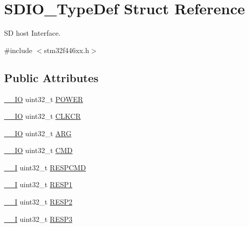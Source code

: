 \hypertarget{struct_s_d_i_o___type_def}{}\section{S\+D\+I\+O\+\_\+\+Type\+Def Struct Reference}
\label{struct_s_d_i_o___type_def}


SD host Interface.  




{\ttfamily \#include $<$stm32f446xx.\+h$>$}

\subsection*{Public Attributes}
\begin{DoxyCompactItemize}
\item 
\hyperlink{core__sc300_8h_aec43007d9998a0a0e01faede4133d6be}{\+\_\+\+\_\+\+IO} uint32\+\_\+t \hyperlink{struct_s_d_i_o___type_def_a7c156bc55f6d970a846a459d57a9e940}{P\+O\+W\+ER}
\item 
\hyperlink{core__sc300_8h_aec43007d9998a0a0e01faede4133d6be}{\+\_\+\+\_\+\+IO} uint32\+\_\+t \hyperlink{struct_s_d_i_o___type_def_aeb1e30ce2038628e45264f75e5e926bb}{C\+L\+K\+CR}
\item 
\hyperlink{core__sc300_8h_aec43007d9998a0a0e01faede4133d6be}{\+\_\+\+\_\+\+IO} uint32\+\_\+t \hyperlink{struct_s_d_i_o___type_def_a3e24392875e98cd09043e54a0990ab7a}{A\+RG}
\item 
\hyperlink{core__sc300_8h_aec43007d9998a0a0e01faede4133d6be}{\+\_\+\+\_\+\+IO} uint32\+\_\+t \hyperlink{struct_s_d_i_o___type_def_abbbdc3174e12dab21123d746d65f345d}{C\+MD}
\item 
\hyperlink{core__sc300_8h_af63697ed9952cc71e1225efe205f6cd3}{\+\_\+\+\_\+I} uint32\+\_\+t \hyperlink{struct_s_d_i_o___type_def_a9d881ed6c2fdecf77e872bcc6b404774}{R\+E\+S\+P\+C\+MD}
\item 
\hyperlink{core__sc300_8h_af63697ed9952cc71e1225efe205f6cd3}{\+\_\+\+\_\+I} uint32\+\_\+t \hyperlink{struct_s_d_i_o___type_def_a2b6f1ca5a5a50f8ef5417fe7be22553c}{R\+E\+S\+P1}
\item 
\hyperlink{core__sc300_8h_af63697ed9952cc71e1225efe205f6cd3}{\+\_\+\+\_\+I} uint32\+\_\+t \hyperlink{struct_s_d_i_o___type_def_a9228c8a38c07c508373644220dd322f0}{R\+E\+S\+P2}
\item 
\hyperlink{core__sc300_8h_af63697ed9952cc71e1225efe205f6cd3}{\+\_\+\+\_\+I} uint32\+\_\+t \hyperlink{struct_s_d_i_o___type_def_a70f3e911570bd326bff852664fd8a7d5}{R\+E\+S\+P3}

\end{DoxyCompactItemize}
